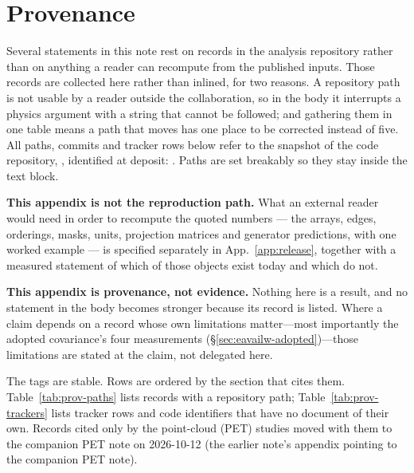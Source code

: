 \section{Provenance}
\label{app:provenance}

Several statements in this note rest on records in the analysis repository rather than on anything a reader can recompute from the published inputs. Those records are collected here rather than inlined, for two reasons. A repository path is not usable by a reader outside the collaboration, so in the body it interrupts a physics argument with a string that cannot be followed; and gathering them in one table means a path that moves has one place to be corrected instead of five. All paths, commits and tracker rows below refer to the snapshot of the code repository, \repolink, identified at deposit: \depositsnapshot. Paths are set breakably so they stay inside the text block.

\textbf{This appendix is not the reproduction path.} What an external reader would need in order to recompute the quoted numbers --- the arrays, edges, orderings, masks, units, projection matrices and generator predictions, with one worked example --- is specified separately in App.~\ref{app:release}, together with a measured statement of which of those objects exist today and which do not.

\textbf{This appendix is provenance, not evidence.} Nothing here is a result, and no statement in the body becomes stronger because its record is listed. Where a claim depends on a record whose own limitations matter---most importantly the adopted covariance's four measurements (\S\ref{sec:eavailw-adopted})---those limitations are stated at the claim, not delegated here.

The tags are stable. Rows are ordered by the section that cites them. Table~\ref{tab:prov-paths} lists records with a repository path; Table~\ref{tab:prov-trackers} lists tracker rows and code identifiers that have no document of their own. Records cited only by the point-cloud (PET) studies moved with them to the companion PET note on 2026-10-12 (the earlier note's appendix pointing to the companion PET note).

